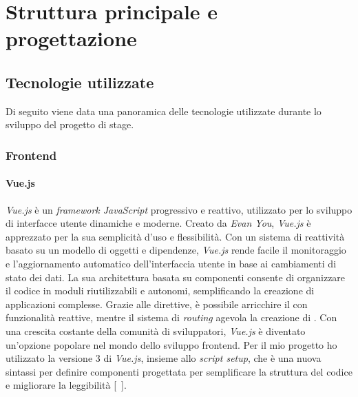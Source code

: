 \chapter{Struttura principale e progettazione}\label{cap:struttura-progettazione}


\section{Tecnologie utilizzate}\label{sec:tecnologie-utilizzate}
Di seguito viene data una panoramica delle tecnologie utilizzate durante lo sviluppo del progetto di stage.

\subsection{Frontend}\label{subsec:frontend}
\subsubsection{Vue.js}\label{subsubsec:vue-js}
\textit{Vue.js} è un \textit{framework JavaScript} progressivo e reattivo, utilizzato per lo sviluppo di interfacce utente dinamiche e moderne. 
Creato da \textit{Evan You}, \textit{Vue.js} è apprezzato per la sua semplicità d'uso e flessibilità. Con un sistema di reattività basato su un modello di oggetti e dipendenze, 
\textit{Vue.js} rende facile il monitoraggio e l'aggiornamento automatico dell'interfaccia utente in base ai cambiamenti di stato dei dati. La sua architettura basata 
su componenti consente di organizzare il codice in moduli riutilizzabili e autonomi, semplificando la creazione di applicazioni complesse. 
Grazie alle direttive, è possibile arricchire il  con funzionalità reattive, mentre il sistema di \textit{routing} agevola la creazione di . 
Con una crescita costante della comunità di sviluppatori, \textit{Vue.js} è diventato un'opzione popolare nel mondo dello sviluppo frontend.
Per il mio progetto ho utilizzato la versione 3 di \textit{Vue.js}, insieme allo \textit{script setup}, che è una nuova sintassi per definire componenti progettata per semplificare la struttura del codice e migliorare la leggibilità [~\cite{site:vue.js}].

